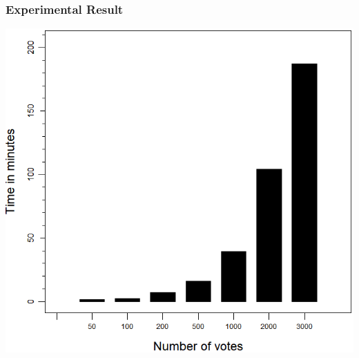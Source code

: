 \documentclass{beamer}
\begin{document}
%
%
%
%
%
%


\begin{frame}
\frametitle{Experimental Result}
{\includegraphics[scale=0.40]{PlotVer3.png}}
\end{frame}
\end{document}
